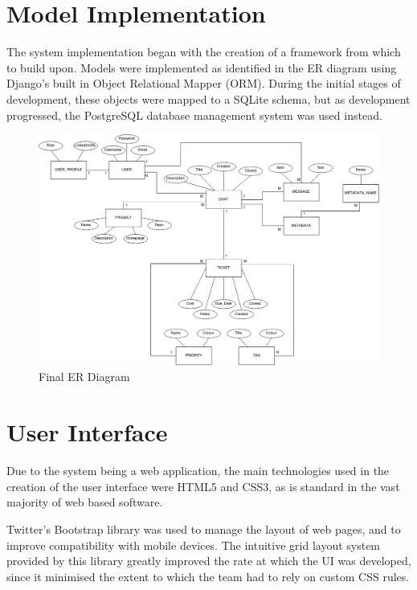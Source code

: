 \documentclass[a4paper]{l3proj}
\begin{document}
\section{Model Implementation}
\label{modelImpl}

The system implementation began with the creation of a framework from which to build upon.  Models were implemented as identified in the ER diagram using Django’s built in Object Relational Mapper (ORM). During the initial stages of development, these objects were mapped to a SQLite schema, but as development progressed, the PostgreSQL database management system was used instead.


\begin{figure}
\includegraphics[scale=0.35]{newERdiagram}
\caption{Final ER Diagram}
\end{figure}
\section{User Interface}
\label{userInterface}

Due to the system being a web application, the main technologies used in the creation of the user interface were HTML5 and CSS3, as is standard in the vast majority of web based software. 

Twitter’s Bootstrap library was used to manage the layout of web pages, and to improve compatibility with mobile devices. The intuitive grid layout system provided by this library greatly improved the rate at which the UI was developed, since it minimised the extent to which the team had to rely on custom CSS rules.
\end{document}
